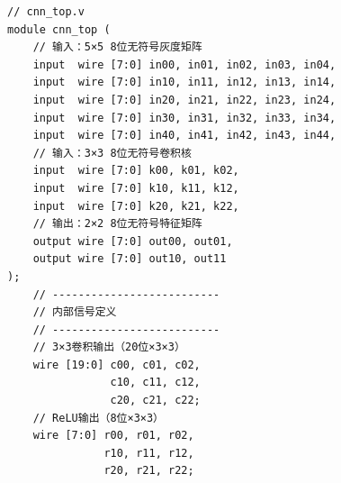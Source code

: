 \documentclass{ctexart}
\begin{document}
\begin{lstlisting}[style=verilog, caption=cnn\_top.v]
// cnn_top.v
module cnn_top (
    // 输入：5×5 8位无符号灰度矩阵
    input  wire [7:0] in00, in01, in02, in03, in04,
    input  wire [7:0] in10, in11, in12, in13, in14,
    input  wire [7:0] in20, in21, in22, in23, in24,
    input  wire [7:0] in30, in31, in32, in33, in34,
    input  wire [7:0] in40, in41, in42, in43, in44,
    // 输入：3×3 8位无符号卷积核
    input  wire [7:0] k00, k01, k02,
    input  wire [7:0] k10, k11, k12,
    input  wire [7:0] k20, k21, k22,
    // 输出：2×2 8位无符号特征矩阵
    output wire [7:0] out00, out01,
    output wire [7:0] out10, out11
);
    // --------------------------
    // 内部信号定义
    // --------------------------
    // 3×3卷积输出（20位×3×3）
    wire [19:0] c00, c01, c02,
                c10, c11, c12,
                c20, c21, c22;
    // ReLU输出（8位×3×3）
    wire [7:0] r00, r01, r02,
               r10, r11, r12,
               r20, r21, r22;


\end{lstlisting}
\end{document}
